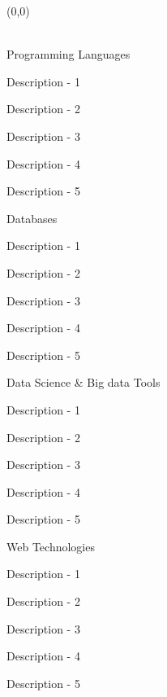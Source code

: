 \documentclass[11pt, a4paper]{resume-lab}
\begin{document}
\begin{Parallel}[v]{0.265\textwidth}{0.66\textwidth}
{\begin{cvletter}
			\end{cvletter}
			
			\begin{textblock}{2}(0,0)
				
				\vspace{5mm}\\
				\skillsection
				{Programming Languages}
				{
					\begin{skillitems} %
						\item {Description - 1}
						\item {Description - 2}
						\item {Description - 3}
						\item {Description - 4}
						\item {Description - 5}
					\end{skillitems}
				}
				
				\skillsection
				{Databases}
				{
					\begin{skillitems} %
						\item {Description - 1}
						\item {Description - 2}
						\item {Description - 3}
						\item {Description - 4}
						\item {Description - 5}
					\end{skillitems}
				}
				
				\skillsection
				{Data Science \& Big data Tools}
				{
					\begin{skillitems} %
						\item {Description - 1}
						\item {Description - 2}
						\item {Description - 3}
						\item {Description - 4}
						\item {Description - 5}
					\end{skillitems}
				}
				
				\skillsection
				{Web Technologies}
				{
					\begin{skillitems} %
						\item {Description - 1}
						\item {Description - 2}
						\item {Description - 3}
						\item {Description - 4}
						\item {Description - 5}
					\end{skillitems}
				}
				

\end{textblock}}
\end{Parallel}
\end{document}
